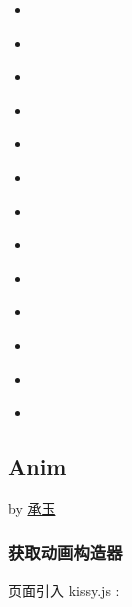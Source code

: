 \documentclass[letterpaper,10pt,english]{sphinxmanual}
\begin{document}
\begin{itemize}
\item {}
{\hyperref[api/core/dom/scrollIntoView:DOM.scrollIntoView]{}}

\item {}
{\hyperref[api/core/dom/parent:DOM.parent]{}}

\item {}
{\hyperref[api/core/dom/next:DOM.next]{}}

\item {}
{\hyperref[api/core/dom/prev:DOM.prev]{}}

\item {}
{\hyperref[api/core/dom/siblings:DOM.siblings]{}}

\item {}
{\hyperref[api/core/dom/children:DOM.children]{}}

\item {}
{\hyperref[api/core/dom/contains:DOM.contains]{}}

\item {}
{\hyperref[api/core/dom/html:DOM.html]{}}

\item {}
{\hyperref[api/core/dom/remove:DOM.remove]{}}

\item {}
{\hyperref[api/core/dom/data:DOM.data]{}}

\item {}
{\hyperref[api/core/dom/removeData:DOM.removeData]{}}

\item {}
{\hyperref[api/core/dom/hasData:DOM.hasData]{}}

\item {}
{\hyperref[api/core/dom/unselectable:DOM.unselectable]{}}

\end{itemize}


\subsection{Anim}
\label{api/core/anim/index:anim}\label{api/core/anim/index::doc}
by \href{mailto:yiminghe@gmail.com}{承玉}


\subsubsection{获取动画构造器}
\label{api/core/anim/index:id2}
页面引入 kissy.js :
\end{document}
